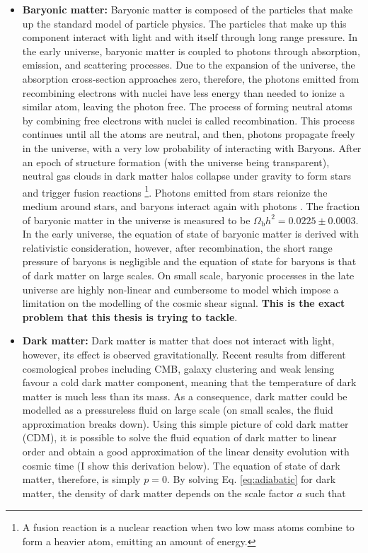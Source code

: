 \begin{itemize}
    \item \textbf{Baryonic matter:} Baryonic matter is composed of the particles that make up the standard model of particle physics. The particles that make up this component interact with light and with itself through long range pressure. In the early universe, baryonic matter is coupled to photons through absorption, emission, and scattering processes. Due to the expansion of the universe, the absorption cross-section approaches zero, therefore, the photons emitted from recombining electrons with nuclei have less energy than needed to ionize a similar atom, leaving the photon free. The process of forming neutral atoms by combining free electrons with nuclei is called recombination. This process continues until all the atoms are neutral, and then, photons propagate freely in the universe, with a very low probability of interacting with Baryons. After an epoch of structure formation (with the universe being transparent), neutral gas clouds in dark matter halos collapse under gravity to form stars and trigger fusion reactions \footnote{A fusion reaction is a nuclear reaction when two low mass atoms combine to form a heavier atom, emitting an amount of energy.}. Photons emitted from stars reionize the medium around stars, and baryons interact again with photons \citep{Draine_2011}. The fraction of baryonic matter in the universe is measured to be $ \Omega_{\mathrm{b}} h^2 = 0.0225 \pm 0.0003$. In the early universe, the equation of state of baryonic matter is derived with relativistic consideration, however, after recombination, the short range pressure of baryons is negligible and the equation of state for baryons is that of dark matter on large scales. On small scale, baryonic processes in the late universe are highly non-linear and cumbersome to model which impose a limitation on the modelling of the cosmic shear signal. \textbf{This is the exact problem that this thesis is trying to tackle}.
    \item \textbf{Dark matter:} Dark matter is matter that does not interact with light, however, its effect is observed gravitationally. Recent results from different cosmological probes including CMB, galaxy clustering and weak lensing favour a cold dark matter component, meaning that the temperature of dark matter is much less than its mass. As a consequence, dark matter could be modelled as a pressureless fluid on large scale (on small scales, the fluid approximation breaks down). Using this simple picture of cold dark matter (CDM), it is possible to solve the fluid equation of dark matter to linear order and obtain a good approximation of the linear density evolution with cosmic time (I show this derivation below). The equation of state of dark matter, therefore, is simply $p = 0$. By solving Eq. \ref{eq:adiabatic} for dark matter, the density of dark matter depends on the scale factor $a$ such that

\end{itemize}
